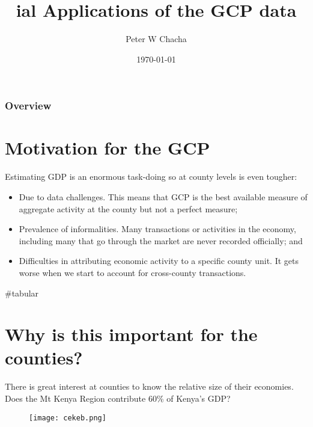\documentclass{beamer}
\title{ial Applications of the GCP data} %
\author{Peter W Chacha} %
\institute[The World Bank Group] %
{
The World Bank Group\\ %
\medskip
}
\date{\today} %
\begin{document}
\begin{frame}
\titlepage %
\end{frame}

\begin{frame}
\frametitle{Overview} %
\tableofcontents %
\end{frame}



\section{Motivation for the GCP}
\begin{frame}{Estimating GDP is an enormous task-doing so at county levels is even tougher:}
    \begin{itemize}
        \item Due to data challenges. This means that GCP is the best available measure of aggregate activity at the county but not a perfect measure;
        \item Prevalence of informalities. Many transactions or activities in the economy, including many that go through the market are never recorded officially; and 
        \item Difficulties in attributing economic activity to a specific county unit. It gets worse when we start to account for cross-county transactions.
    \end{itemize}

#tabular

\end{frame}
\section{Why is this important for the counties?}
\begin{frame}{There is great interest at counties to know the relative size of their economies.}
    Does the Mt Kenya Region contribute 60\% of Kenya's GDP?
 \begin{figure}[H]
  \centering
  \texttt{[image: cekeb.png]}
 \end{figure}
\end{frame}
\end{document}
